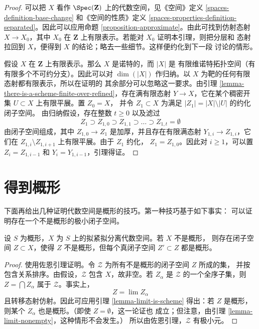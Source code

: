 \begin{proof}
可以把 $X$ 看作 $\Spec(\mathbf{Z})$ 上的代数空间，见《空间》定义
\ref{spaces-definition-base-change} 和《空间的性质》定义
\ref{spaces-properties-definition-separated}。因此可以应用命题
\ref{proposition-approximate}。由此可找到仿射态射 $X \to X_0$，其中
$X_0$ 在 $\mathbf{Z}$ 上有限表示。若能对 $X_0$ 证明本引理，则把分层和
态射拉回到 $X$，便得到 $X$ 的结论；略去一些细节。这样便约化到下一段
讨论的情形。

\medskip\noindent
假设 $X$ 在 $\mathbf{Z}$ 上有限表示。那么 $X$ 是诺特的，而 $|X|$ 是
有限维诺特拓扑空间（有有限多个不可约分支）。因此可以对
$\dim(|X|)$ 作归纳。以 $X$ 为靶的任何有限态射都有限表示，所以在证明的
其余部分可以忽略这一要求。由引理
\ref{lemma-there-is-a-scheme-finite-over-refined}，存在满有限态射
$Y \to X$，它在某个稠密开集 $U \subset X$ 上有限平展。置 $Z_0 = X$，
并令 $Z_1 \subset X$ 为满足 $|Z_1| = |X| \setminus |U|$ 的约化闭子空间。
由归纳假设，存在整数 $t \geq 0$ 以及滤过
$$
Z_1 \supset Z_{1, 0} \supset Z_{1, 1} \supset \ldots
\supset Z_{1, t} = \emptyset
$$
由闭子空间组成，其中 $Z_{1, 0} \to Z_1$ 是加厚，并且存在有限满态射
$Y_{1, i} \to Z_{1, i}$，它们在
$Z_{1, i} \setminus Z_{1, i + 1}$ 上有限平展。由于 $Z_1$ 约化，
$Z_1 = Z_{1, 0}$。因此对 $i \geq 1$，可以置
$Z_i = Z_{1, i - 1}$ 和 $Y_i = Y_{1, i - 1}$，引理得证。
\end{proof}











\section{得到概形}
\label{section-representable}

\noindent
下面再给出几种证明代数空间是概形的技巧。第一种技巧基于如下事实：
可以证明存在一个不是概形的极小闭子空间。

\begin{lemma}
\label{lemma-minimal-closed-subspace}
设 $S$ 为概形，$X$ 为 $S$ 上的拟紧拟分离代数空间。若 $X$ 不是概形，
则存在闭子空间 $Z \subset X$，使得 $Z$ 不是概形，但每个真闭子空间
$Z' \subset Z$ 都是概形。
\end{lemma}

\begin{proof}
使用佐恩引理证明。令 $\mathcal{Z}$ 为所有不是概形的闭子空间 $Z$ 所成的集，
并按包含关系排序。由假设，$\mathcal{Z}$ 包含 $X$，故非空。若
$Z_\alpha$ 是 $\mathcal{Z}$ 的一个全序子集，则
$Z = \bigcap Z_\alpha$ 属于 $\mathcal{Z}$。事实上，
$$
Z = \lim Z_\alpha
$$
且转移态射仿射。因此可应用引理 \ref{lemma-limit-is-scheme} 得出：若 $Z$
是概形，则某个 $Z_\alpha$ 也是概形。（即使 $Z = \emptyset$，这一论证也
成立；但注意，由引理 \ref{lemma-limit-nonempty}，这种情形不会发生。）
所以由佐恩引理，$\mathcal{Z}$ 有极小元。
\end{proof}

